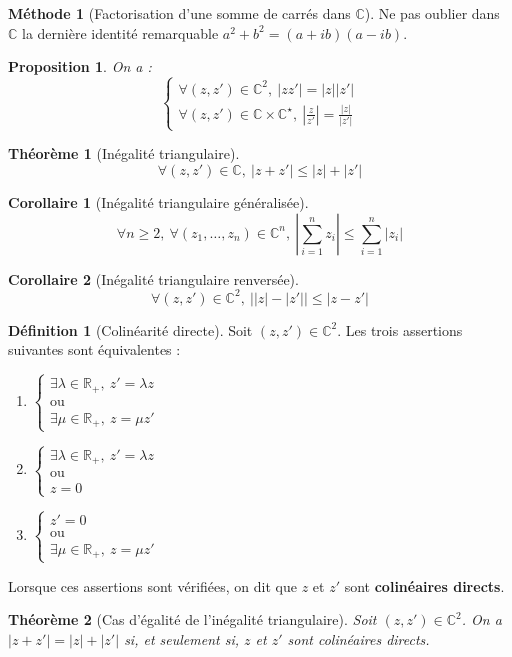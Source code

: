 \documentclass[french]{book}
\newcommand{\R}{\mathbb{R}}
\newcommand{\C}{\mathbb{C}}
\newcommand{\st}{^\star}
\theoremstyle{plain}
\newtheorem{thm}{Théorème}[chapter]
\newtheorem{prop}{Proposition}[chapter]
\newtheorem{cor}{Corollaire}[chapter]
\theoremstyle{definition}
\newtheorem{dfn}{Définition}[chapter]
\newtheorem{met}{Méthode}[chapter]
\theoremstyle{remark}
\begin{document}
\begin{met}[Factorisation d'une somme de carrés dans $\C$]
	Ne pas oublier dans $\C$ la dernière identité remarquable $a^2+b^2=(a+ib)(a-ib)$.
\end{met}
\begin{prop}
	On a :
	$$\begin{cases}
		\forall (z,z')\in\C^2,\ \lvert zz'\rvert=\lvert z\rvert \lvert z'\rvert \\
		\forall(z,z')\in\C\times\C\st,\ \displaystyle\left\lvert\frac{z}{z'}\right\rvert=\frac{\lvert z\rvert}{\lvert z'\rvert}
	\end{cases}$$
\end{prop}
\begin{thm}[Inégalité triangulaire]
	$$\forall(z,z')\in\C,\ \lvert z+z'\rvert\leqslant\lvert z\rvert+\lvert z'\rvert$$
\end{thm}
\begin{cor}[Inégalité triangulaire généralisée]
	$$\forall n\geqslant2,\ \forall (z_1,\ldots,z_n)\in\C^n,\ \left\lvert\sum_{i=1}^{n}z_i\right\rvert\leqslant\sum_{i=1}^{n}\lvert z_i\rvert$$
\end{cor}
\begin{cor}[Inégalité triangulaire renversée]
	$$\forall(z,z')\in\C^2,\ \big|\lvert z\rvert-\lvert z'\rvert\big|\leqslant\lvert z-z'\rvert$$
\end{cor}
\begin{dfn}[Colinéarité directe]
	Soit $(z,z')\in\C^2$. Les trois assertions suivantes sont équivalentes :
	\begin{enumerate}
		\item $\displaystyle\begin{cases}
			\exists\lambda\in\R_+,\ z'=\lambda z \\
			\text{ou}\\
			\exists\mu\in\R_+,\ z=\mu z'
		\end{cases}$
		\item $\displaystyle\begin{cases}
			\exists\lambda\in\R_+,\ z'=\lambda z \\
			\text{ou}\\
			z=0
		\end{cases}$
		\item $\displaystyle\begin{cases}
			z'=0\\
			\text{ou}\\
			\exists\mu\in\R_+,\ z=\mu z'
		\end{cases}$
	\end{enumerate} Lorsque ces assertions sont vérifiées, on dit que $z$ et $z'$ sont \textbf{colinéaires directs}.
\end{dfn}
\begin{thm}[Cas d'égalité de l'inégalité triangulaire]
	Soit $(z,z')\in\C^2$. On a $\lvert z+z'\rvert=\lvert z\rvert+\lvert z'\rvert$ si, et seulement si, $z$ et $z'$ sont colinéaires directs.
\end{thm}
\end{document}

